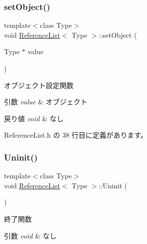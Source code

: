 \subsubsection{\texorpdfstring{set\+Object()}{setObject()}}
{\footnotesize\ttfamily template$<$class Type$>$ \\
void \mbox{\hyperlink{class_reference_list}{Reference\+List}}$<$ Type $>$\+::set\+Object (\begin{DoxyParamCaption}\item[{Type $\ast$}]{value }\end{DoxyParamCaption})\hspace{0.3cm}{\ttfamily [inline]}}



オブジェクト設定関数 


\begin{DoxyParams}{引数}
{\em value} & オブジェクト \\
\hline
\end{DoxyParams}

\begin{DoxyRetVals}{戻り値}
{\em void} & なし \\
\hline
\end{DoxyRetVals}


 Reference\+List.\+h の 38 行目に定義があります。

\mbox{\label{class_reference_list_a549cf7b92db6d920fc9a92c2ad33f0c5}} 
\subsubsection{\texorpdfstring{Uninit()}{Uninit()}}
{\footnotesize\ttfamily template$<$class Type$>$ \\
void \mbox{\hyperlink{class_reference_list}{Reference\+List}}$<$ Type $>$\+::Uninit (\begin{DoxyParamCaption}{ }\end{DoxyParamCaption})\hspace{0.3cm}{\ttfamily [inline]}}



終了関数 


\begin{DoxyParams}{引数}
{\em void} & なし \\
\hline
\end{DoxyParams}

